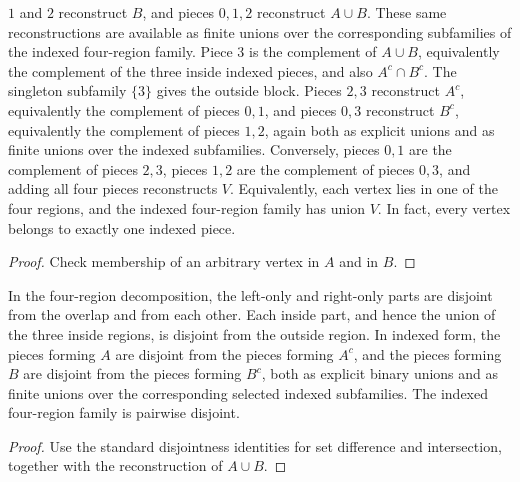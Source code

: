 \begin{lemma}
    $1$ and $2$ reconstruct $B$, and pieces $0,1,2$ reconstruct $A\cup B$.
    These same reconstructions are available as finite unions over the
    corresponding subfamilies of the indexed four-region family.
    Piece $3$ is the complement of $A\cup B$, equivalently the complement of
    the three inside indexed pieces, and also $A^c\cap B^c$. The singleton
    subfamily $\{3\}$ gives the outside block. Pieces $2,3$
    reconstruct $A^c$, equivalently the complement of pieces $0,1$, and
    pieces $0,3$ reconstruct $B^c$, equivalently the complement of pieces
    $1,2$, again both as explicit unions and as finite unions over the
    indexed subfamilies. Conversely, pieces $0,1$ are the
    complement of pieces $2,3$,
    pieces $1,2$ are the complement of pieces $0,3$, and adding all four
    pieces reconstructs $V$.
    Equivalently, each vertex lies in one of the four regions, and the indexed
    four-region family has union $V$. In fact, every vertex belongs to exactly
    one indexed piece.
\end{lemma}
\begin{proof}\leanok
    Check membership of an arbitrary vertex in $A$ and in $B$.
\end{proof}

\begin{lemma}%
    \label{lem:peps_regionUnionDecomposition_disjoint}
    \leanok
    In the four-region decomposition, the left-only and right-only parts are
    disjoint from the overlap and from each other. Each inside part, and hence
    the union of the three inside regions, is disjoint from the outside region.
    In indexed form, the pieces forming $A$ are disjoint from the pieces
    forming $A^c$, and the pieces forming $B$ are disjoint from the pieces
    forming $B^c$, both as explicit binary unions and as finite unions over
    the corresponding selected indexed subfamilies. The indexed four-region
    family is pairwise disjoint.
\end{lemma}
\begin{proof}\leanok
    Use the standard disjointness identities for set difference and
    intersection, together with the reconstruction of $A\cup B$.
\end{proof}

